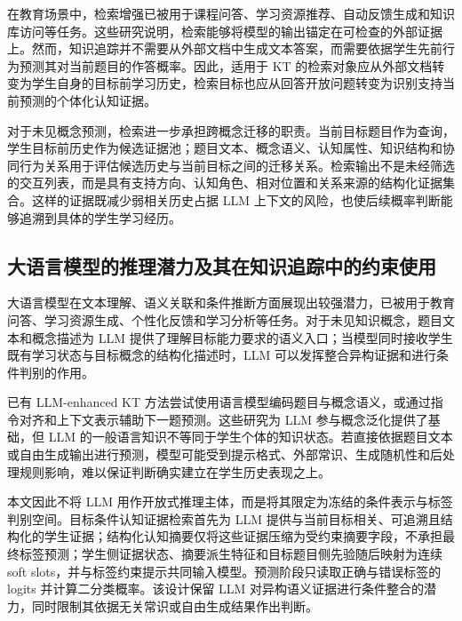 \documentclass[UTF8,a4paper,12pt]{ctexart}
\numberwithin{table}{section}
\begin{document}
在教育场景中，检索增强已被用于课程问答、学习资源推荐、自动反馈生成和知识库访问等任务\citep{li2025ragedusurvey,swacha2025ragchatbots,dong2023kgrag,zheng2024edukdqa}。这些研究说明，检索能够将模型的输出锚定在可检查的外部证据上。然而，知识追踪并不需要从外部文档中生成文本答案，而需要依据学生先前行为预测其对当前题目的作答概率。因此，适用于 KT 的检索对象应从外部文档转变为学生自身的目标前学习历史，检索目标也应从回答开放问题转变为识别支持当前预测的个体化认知证据。



对于未见概念预测，检索进一步承担跨概念迁移的职责。当前目标题目作为查询，学生目标前历史作为候选证据池；题目文本、概念语义、认知属性、知识结构和协同行为关系用于评估候选历史与当前目标之间的迁移关系。检索输出不是未经筛选的交互列表，而是具有支持方向、认知角色、相对位置和关系来源的结构化证据集合。这样的证据既减少弱相关历史占据 LLM 上下文的风险，也使后续概率判断能够追溯到具体的学生学习经历。

\subsection{大语言模型的推理潜力及其在知识追踪中的约束使用}



大语言模型在文本理解、语义关联和条件推断方面展现出较强潜力，已被用于教育问答、学习资源生成、个性化反馈和学习分析等任务\citep{kasneci2023chatgpt,cho2024systematic}。对于未见知识概念，题目文本和概念描述为 LLM 提供了理解目标能力要求的语义入口；当模型同时接收学生既有学习状态与目标概念的结构化描述时，LLM 可以发挥整合异构证据和进行条件判别的作用。



已有 LLM-enhanced KT 方法尝试使用语言模型编码题目与概念语义，或通过指令对齐和上下文表示辅助下一题预测\citep{fu2024sinkt,wang2025llmkt}。这些研究为 LLM 参与概念泛化提供了基础，但 LLM 的一般语言知识不等同于学生个体的知识状态。若直接依据题目文本或自由生成输出进行预测，模型可能受到提示格式、外部常识、生成随机性和后处理规则影响，难以保证判断确实建立在学生历史表现之上。



本文因此不将 LLM 用作开放式推理主体，而是将其限定为冻结的条件表示与标签判别空间。目标条件认知证据检索首先为 LLM 提供与当前目标相关、可追溯且结构化的学生证据；结构化认知摘要仅将这些证据压缩为受约束摘要字段，不承担最终标签预测；学生侧证据状态、摘要派生特征和目标题目侧先验随后映射为连续 soft slots，并与标签约束提示共同输入模型。预测阶段只读取正确与错误标签的 logits 并计算二分类概率。该设计保留 LLM 对异构语义证据进行条件整合的潜力，同时限制其依据无关常识或自由生成结果作出判断。
\end{document}
